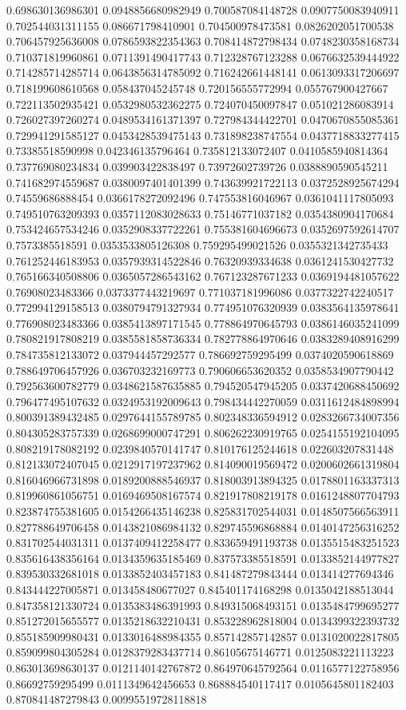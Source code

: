 \begin{table}
\begin{tabu}
\begin{sparkline}{10}
0.698630136986301 0.0948856680982949 0.700587084148728 0.0907750083940911 0.702544031311155 0.086671798410901 0.704500978473581 0.0826202051700538 0.706457925636008 0.0786593822354363 0.708414872798434 0.0748230358168734 0.710371819960861 0.0711391490417743 0.712328767123288 0.0676632539444922 0.714285714285714 0.0643856314785092 0.716242661448141 0.0613093317206697 0.718199608610568 0.058437045245748 0.720156555772994 0.055767900427667 0.722113502935421 0.0532980532362275 0.724070450097847 0.051021286083914 0.726027397260274 0.0489534161371397 0.727984344422701 0.0470670855085361 0.729941291585127 0.0453428539475143 0.731898238747554 0.0437718833277415 0.73385518590998 0.042346135796464 0.735812133072407 0.0410585940814364 0.737769080234834 0.039903422838497 0.73972602739726 0.0388890590545211 0.741682974559687 0.0380097401401399 0.743639921722113 0.0372528925674294 0.74559686888454 0.0366178272092496 0.747553816046967 0.0361041117805093 0.749510763209393 0.0357112083028633 0.75146771037182 0.0354380904170684 0.753424657534246 0.0352908337722261 0.755381604696673 0.0352697592614707 0.7573385518591 0.0353533805126308 0.759295499021526 0.0355321342735433 0.761252446183953 0.0357939314522846 0.76320939334638 0.0361241530427732 0.765166340508806 0.0365057286543162 0.767123287671233 0.0369194481057622 0.76908023483366 0.0373377443219697 0.771037181996086 0.0377322742240517 0.772994129158513 0.0380794791327934 0.774951076320939 0.0383564135978641 0.776908023483366 0.0385413897171545 0.778864970645793 0.0386146035241099 0.780821917808219 0.0385581858736334 0.782778864970646 0.0383289408916299 0.784735812133072 0.037944457292577 0.786692759295499 0.0374020590618869 0.788649706457926 0.036703232169773 0.790606653620352 0.0358534907790442 0.792563600782779 0.0348621587635885 0.794520547945205 0.0337420688450692 0.796477495107632 0.0324953192009643 0.798434442270059 0.0311612484898994 0.800391389432485 0.0297644155789785 0.802348336594912 0.0283266734007356 0.804305283757339 0.0268699000747291 0.806262230919765 0.0254155192104095 0.808219178082192 0.0239840570141747 0.810176125244618 0.022603207831448 0.812133072407045 0.0212917197237962 0.814090019569472 0.0200602661319804 0.816046966731898 0.0189200888546937 0.818003913894325 0.0178801163337313 0.819960861056751 0.0169469508167574 0.821917808219178 0.0161248807704793 0.823874755381605 0.0154266435146238 0.825831702544031 0.0148507566563911 0.827788649706458 0.0143821086984132 0.829745596868884 0.0140147256316252 0.831702544031311 0.0137409412258477 0.833659491193738 0.0135515483251523 0.835616438356164 0.0134359635185469 0.837573385518591 0.0133852144977827 0.839530332681018 0.0133852403457183 0.841487279843444 0.013414277694346 0.843444227005871 0.013458480677027 0.845401174168298 0.0135042188513044 0.847358121330724 0.0135383486391993 0.849315068493151 0.0135484799695277 0.851272015655577 0.0135218632210431 0.853228962818004 0.0134399322393732 0.855185909980431 0.0133016488984355 0.857142857142857 0.0131020022817805 0.859099804305284 0.0128379283437714 0.86105675146771 0.0125083221113223 0.863013698630137 0.0121140142767872 0.864970645792564 0.0116577122758956 0.86692759295499 0.0111349642456653 0.868884540117417 0.0105645801182403 0.870841487279843 0.00995519728118818 
\end{sparkline}
\end{tabu}
\end{table}
